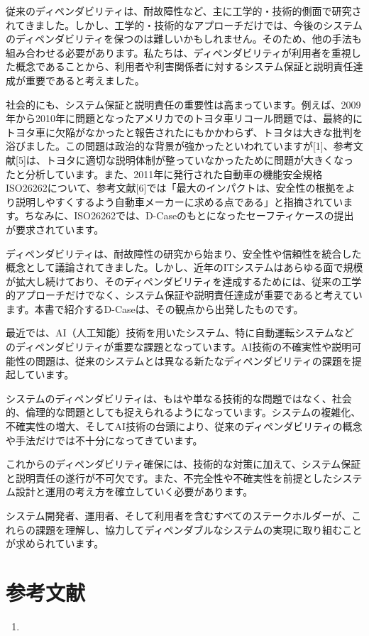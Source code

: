 従来のディペンダビリティは、耐故障性など、主に工学的・技術的側面で研究されてきました。しかし、工学的・技術的なアプローチだけでは、今後のシステムのディペンダビリティを保つのは難しいかもしれません。そのため、他の手法も組み合わせる必要があります。私たちは、ディペンダビリティが利用者を重視した概念であることから、利用者や利害関係者に対するシステム保証と説明責任達成が重要であると考えました。

社会的にも、システム保証と説明責任の重要性は高まっています。例えば、2009年から2010年に問題となったアメリカでのトヨタ車リコール問題では、最終的にトヨタ車に欠陥がなかったと報告されたにもかかわらず、トヨタは大きな批判を浴びました。この問題は政治的な背景が強かったといわれていますが[1]、参考文献[5]は、トヨタに適切な説明体制が整っていなかったために問題が大きくなったと分析しています。また、2011年に発行された自動車の機能安全規格ISO26262について、参考文献[6]では「最大のインパクトは、安全性の根拠をより説明しやすくするよう自動車メーカーに求める点である」と指摘されています。ちなみに、ISO26262では、D-Caseのもとになったセーフティケースの提出が要求されています。

ディペンダビリティは、耐故障性の研究から始まり、安全性や信頼性を統合した概念として議論されてきました。しかし、近年のITシステムはあらゆる面で規模が拡大し続けており、そのディペンダビリティを達成するためには、従来の工学的アプローチだけでなく、システム保証や説明責任達成が重要であると考えています。本書で紹介するD-Caseは、その観点から出発したものです。


最近では、AI（人工知能）技術を用いたシステム、特に自動運転システムなどのディペンダビリティが重要な課題となっています。AI技術の不確実性や説明可能性の問題は、従来のシステムとは異なる新たなディペンダビリティの課題を提起しています。


システムのディペンダビリティは、もはや単なる技術的な問題ではなく、社会的、倫理的な問題としても捉えられるようになっています。システムの複雑化、不確実性の増大、そしてAI技術の台頭により、従来のディペンダビリティの概念や手法だけでは不十分になってきています。

これからのディペンダビリティ確保には、技術的な対策に加えて、システム保証と説明責任の遂行が不可欠です。また、不完全性や不確実性を前提としたシステム設計と運用の考え方を確立していく必要があります。

システム開発者、運用者、そして利用者を含むすべてのステークホルダーが、これらの課題を理解し、協力してディペンダブルなシステムの実現に取り組むことが求められています。

\section*{参考文献}
\begin{enumerate}
\item 
\end{enumerate}

